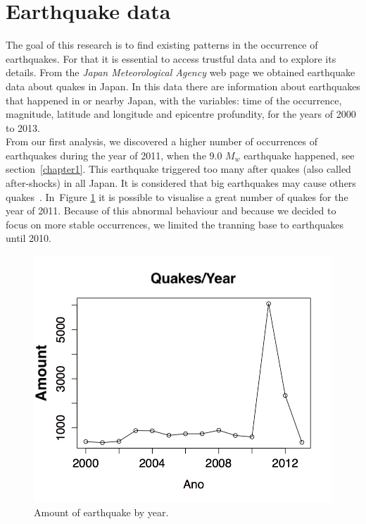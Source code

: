 \section{Earthquake data}
The goal of this research is to find existing patterns in the occurrence of earthquakes. For that it is essential to access trustful data and to explore its details. From the  {\it Japan Meteorological Agency} web page we obtained earthquake data about quakes in Japan. In this data there are information about earthquakes that happened in or nearby Japan,  with the variables: time of the occurrence, magnitude, latitude and longitude and epicentre profundity, for the years of 2000 to 2013.\\

From our first analysis, we discovered a higher number of occurrences of earthquakes during the year of 2011, when the 9.0 $M_w$ earthquake happened, see section~\ref{chapter1}. This earthquake triggered too many after quakes (also called after-shocks) in all Japan. It is considered that big earthquakes may cause others quakes~\cite{zhuang2004analyzing}. In~Figure \ref{ocorrenciasAno} it is possible to visualise a great number of quakes for the year of 2011. Because of this abnormal behaviour and because we decided to focus on more stable occurrences, we limited the tranning base to earthquakes until 2010.\\

\begin{figure}[!htb]
\centering
\includegraphics[scale=0.5]{img/ocorrenciasAno.png}
\caption{Amount of earthquake by year.}
\label{ocorrenciasAno}
\end{figure}


